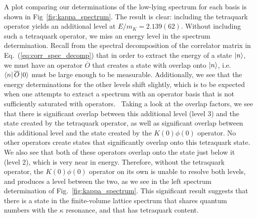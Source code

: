 A plot comparing our determinations of the low-lying spectrum for each basis is shown in Fig~\ref{fig:kappa_spectrum}. The result is clear: including the tetraquark operator yields an additional level at $E/m_K = 2.139(62)$. Without including such a tetraquark operator, we miss an energy level in the spectrum determination. Recall from the spectral decomposition of the correlator matrix in Eq.~(\ref{eq:corr_spec_decomp}) that in order to extract the energy of a state $\ket{n}$, we must have an operator $\overline O$ that creates a state with overlap onto $\ket{n}$, i.e.\ $\bra{n}\overline O\ket{0}$ must be large enough to be measurable. Additionally, we see that the energy determinations for the other levels shift slightly, which is to be expected when one attempts to extract a spectrum with an operator basis that is not sufficiently saturated with operators.~\cite{Dudek:2012xn} Taking a look at the overlap factors, we see that there is significant overlap between this additional level (level 3) and the state created by the tetraquark operator, as well as significant overlap between this additional level and the state created by the $K(0)\phi(0)$ operator. No other operators create states that significantly overlap onto this tetraquark state. We also see that both of these operators overlap onto the state just below it (level 2), which is very near in energy. Therefore, without the tetraquark operator, the $K(0)\phi(0)$ operator on its own is unable to resolve both levels, and produces a level between the two, as we see in the left spectrum determination of Fig.~\ref{fig:kappa_spectrum}. This significant result suggests that there is a state in the finite-volume lattice spectrum that shares quantum numbers with the $\kappa$ resonance, and that has tetraquark content.

